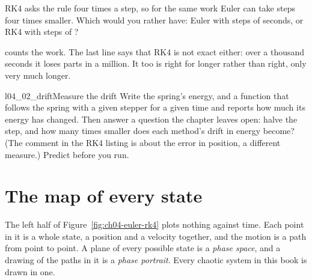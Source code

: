 \begin{think}
RK4 asks the rule four times a step, so for the same work Euler can take
steps four times smaller. Which would you rather have: Euler with steps of
 seconds, or RK4 with steps of ?
\end{think}



\noindent
{} counts the work. The last line says that RK4 is not exact
either: over a thousand seconds it loses  parts in
a million. It too is right for longer rather than right, only very much
longer.

\begin{lab}{l04_02_drift}{Measure the drift}
Write the spring's energy, and a function that follows the spring with a
given stepper for a given time and reports how much its energy has changed.
Then answer a question the chapter leaves open: halve the step, and how many
times smaller does each method's drift in energy become? (The comment in the
RK4 listing is about the error in position, a different measure.) Predict
before you run.
\end{lab}


\section{The map of every state}
\label{sec:ch04-phase}

\noindent
The left half of Figure~\ref{fig:ch04-euler-rk4} plots nothing against time.
Each point in it is a whole state, a position and a velocity together, and
the motion is a path from point to point. A plane of every possible state is
a \emph{phase space}, and a drawing of the paths in it is a \emph{phase
portrait}. Every chaotic system in this book is drawn in one.


